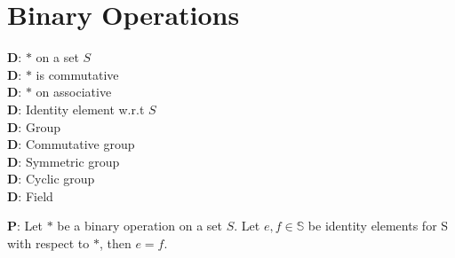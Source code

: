 \documentclass[a4paper]{article}
\begin{document}
\section*{Binary Operations}
\begin{multicols}{3}
	\noindent
	\textbf{D}: $*$ on a set $S$\\
	\textbf{D}: $*$ is commutative\\
	\textbf{D}: $*$ on associative\\
	\textbf{D}: Identity element w.r.t $S$\\
	\textbf{D}: Group\\
	\textbf{D}: Commutative group\\
	\textbf{D}: Symmetric group\\
	\textbf{D}: Cyclic group\\
	\textbf{D}: Field
\end{multicols}
	\noindent
	\textbf{P}: Let $*$ be a binary operation on a set $S$. Let $e,f \in \mathbb{S}$ be identity elements for S with respect to $*$, then $e = f$.
\end{document}
